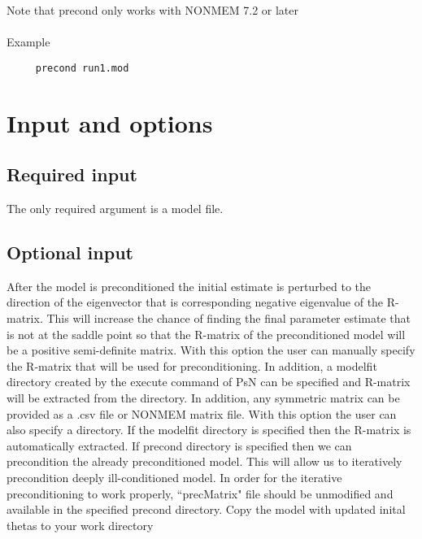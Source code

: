 Note that precond only works with NONMEM 7.2 or later
\\
\\
Example 

\begin{verbatim}
     precond run1.mod
\end{verbatim}

\section{Input and options}

\subsection{Required input}
The only required argument is a model file.

\subsection{Optional input}

\begin{optionlist}
After the model is preconditioned the initial estimate is perturbed to the direction of the eigenvector that is corresponding negative eigenvalue of the R-matrix.  This will increase the chance of finding the final parameter estimate that is not at the saddle point so that the R-matrix of the preconditioned model will be a positive semi-definite matrix.
\nextopt
{}
With this option the user can manually specify the R-matrix that will be used for preconditioning.  In addition, a modelfit directory created by the execute command of PsN can be specified and R-matrix will be extracted from the directory.  In addition, any symmetric matrix can be provided as a .csv file or NONMEM matrix file.
\nextopt
{}
With this option the user can also specify a directory.  If the modelfit directory is specified then the R-matrix is automatically extracted.  If precond directory is specified then we can precondition the already preconditioned model.  This will allow us to iteratively precondition deeply ill-conditioned model.  In order for the iterative preconditioning to work properly, ``precMatrix" file should be unmodified and available in the specified precond directory.
\nextopt
{}
Copy the model with updated inital thetas to your work directory	
\nextopt
\end{optionlist}

